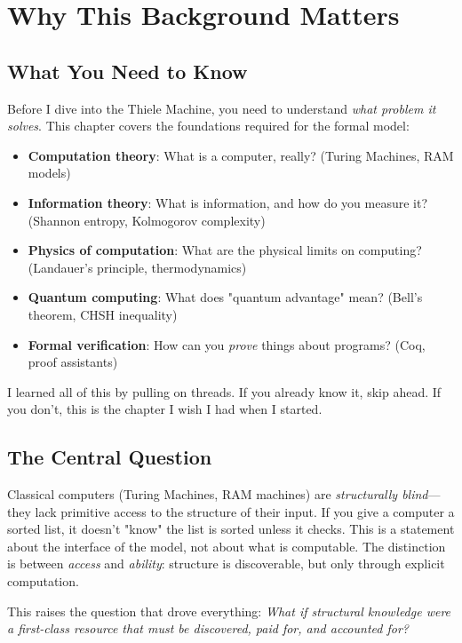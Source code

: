 \section{Why This Background Matters}

\subsection{What You Need to Know}

Before I dive into the Thiele Machine, you need to understand \textit{what problem it solves}. This chapter covers the foundations required for the formal model:
\begin{itemize}
    \item \textbf{Computation theory}: What is a computer, really? (Turing Machines, RAM models)
    \item \textbf{Information theory}: What is information, and how do you measure it? (Shannon entropy, Kolmogorov complexity)
    \item \textbf{Physics of computation}: What are the physical limits on computing? (Landauer's principle, thermodynamics)
    \item \textbf{Quantum computing}: What does "quantum advantage" mean? (Bell's theorem, CHSH inequality)
    \item \textbf{Formal verification}: How can you \textit{prove} things about programs? (Coq, proof assistants)
\end{itemize}

I learned all of this by pulling on threads. If you already know it, skip ahead. If you don't, this is the chapter I wish I had when I started.

\subsection{The Central Question}

Classical computers (Turing Machines, RAM machines) are \textit{structurally blind}---they lack primitive access to the structure of their input. If you give a computer a sorted list, it doesn't "know" the list is sorted unless it checks. This is a statement about the interface of the model, not about what is computable. The distinction is between \emph{access} and \emph{ability}: structure is discoverable, but only through explicit computation.

This raises the question that drove everything: \textit{What if structural knowledge were a first-class resource that must be discovered, paid for, and accounted for?}

